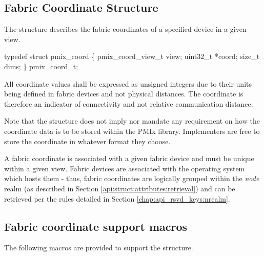 \begin{arglist}
\end{arglist}


\subsection{Fabric Coordinate Structure}

The  structure describes the fabric coordinates of a specified device in a given view.

\cspecificstart
\begin{codepar}
typedef struct pmix_coord \{
    pmix_coord_view_t view;
    uint32_t *coord;
    size_t dims;
\} pmix_coord_t;
\end{codepar}
\cspecificend

All coordinate values shall be expressed as unsigned integers due to their units being defined in fabric devices and not physical distances. The coordinate is therefore an indicator of connectivity and not relative communication distance.

\adviceimplstart
Note that the  structure does not imply nor mandate any requirement on how the coordinate data is to be stored within the \ac{PMIx} library. Implementers are free to store the coordinate in whatever format they choose.
\adviceimplend

A fabric coordinate is associated with a given fabric device and must be unique within a given view. Fabric devices are associated with the operating system which hosts them - thus, fabric coordinates are logically grouped within the \emph{node} realm (as described in Section \ref{api:struct:attributes:retrieval}) and can be retrieved per the rules detailed in Section \ref{chap:api_rsvd_keys:nrealm}.

\subsection{Fabric coordinate support macros}
\label{api:netcoord:macros}

The following macros are provided to support the  structure.


